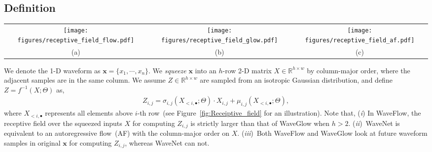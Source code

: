 \documentclass{article}
\newcommand{\vv}[1]{\boldsymbol{#1}}
\begin{document}
\subsection{Definition}
\label{subsec:definition}
\vspace{-.1em}
\begin{figure*}[t] \centering
\begin{tabular}{ccc}
\texttt{[image: figures/receptive\_field\_flow.pdf]} 
&\hspace{1.0cm}
\texttt{[image: figures/receptive\_field\_glow.pdf]} 
&\hspace{1.0cm}
\texttt{[image: figures/receptive\_field\_af.pdf]} 
\\
\vspace{-.3em}
{\small (a)}  & \hspace{1.0cm}  {\small(b)} & \hspace{1.0cm} {\small(c)} 
\\
\end{tabular}
\vspace{-.5em}
\caption{The receptive fields over the squeezed inputs $X$ for computing $Z_{i,j}$ in  (a)~WaveFlow, (b)~WaveGlow, and (c)~autoregressive flow with column-major order~(e.g., WaveNet).}
\vspace{-.3em}
\label{fig:Receiptive_field} \end{figure*}
We denote the 1-D waveform as $\vv x = \{x_1, \cdots, x_n \}$.
We \emph{squeeze} $\vv x$ into an $h$-row 2-D matrix $X \in \mathbb{R}^{h \times w}$ by column-major order, where the adjacent samples are in the same column. We assume $Z \in \mathbb{R}^{h \times w}$ are sampled from an isotropic Gaussian distribution, and define $Z = f^{-1}(X; \Theta)$ as,
\begin{align}
\label{eq:waveflow_inverse_transform}
Z_{i, j} = \sigma_{i,j} (X_{<i, \bullet}; \Theta) \cdot X_{i,j} + \mu_{i,j}(X_{<i, \bullet}; \Theta),
\end{align}
where $X_{<i, \bullet}$ represents all elements above $i$-th row~(see Figure~\ref{fig:Receiptive_field} for an illustration).
Note that, (\emph{i}) In WaveFlow, the receptive field over the squeezed inputs $X$ for computing $Z_{i,j}$  is strictly larger than that of WaveGlow when $h>2$.
(\emph{ii})~WaveNet is equivalent to an autoregressive flow~(AF) with the column-major order on $X$. 
(\emph{iii})~Both WaveFlow and WaveGlow look at future waveform samples in original $\vv x$ for computing $Z_{i, j}$, whereas WaveNet can not.
\end{document}
